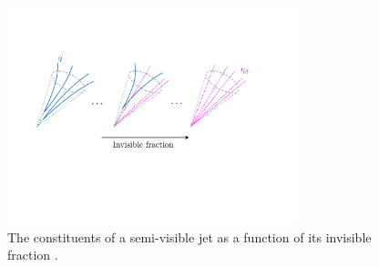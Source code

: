\begin{figure}[htbp]
\centering
\includegraphics[width=0.75\textwidth]{figures/svj/r_inv.pdf}
\caption[The constituents of a semi-visible jet as a function of its invisible fraction]{The constituents of a semi-visible jet as a function of its invisible fraction \rinv \cite{Cohen:2017pzm}.}
\label{fig:theory_svj_rinv}
\end{figure}

